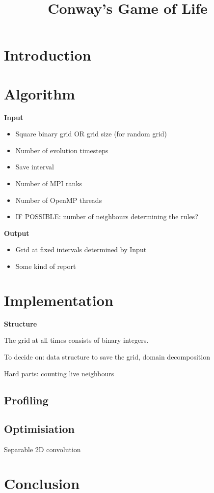 \documentclass[a4paper]{article}
\title{Conway's Game of Life}
\begin{document}
\maketitle

\section*{Introduction}


\section*{Algorithm}

\textbf{Input}
\begin{itemize}
    \item Square binary grid OR grid size (for random grid)
    \item Number of evolution timesteps
    \item Save interval
    \item Number of MPI ranks
    \item Number of OpenMP threads
    \item IF POSSIBLE: number of neighbours determining the rules?
\end{itemize}

\textbf{Output}
\begin{itemize}
    \item Grid at fixed intervals determined by Input
    \item Some kind of report
\end{itemize}

\section*{Implementation}

\textbf{Structure}

The grid at all times consists of binary integers.

To decide on: data structure to save the grid, domain decomposition

Hard parts: counting live neighbours

\subsection*{Profiling}

\subsection*{Optimisiation}

Separable 2D convolution

\section*{Conclusion}
\end{document}
